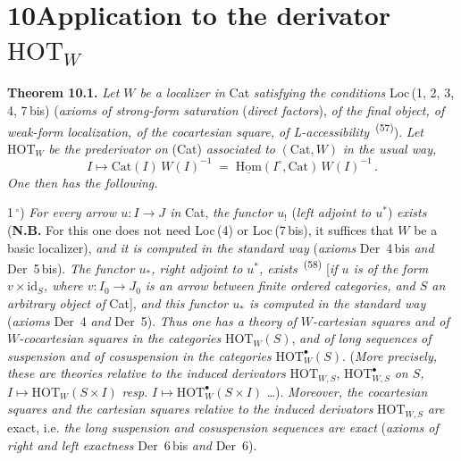 \documentclass[11pt]{article}
\newcommand{\printedpage}[1]{\marginpar{\footnotesize p.~#1}}
\newcommand{\msp}[1]{\marginpar{\footnotesize [#1]}}
\newcommand{\HOT}{\mathrm{HOT}}
\begin{document}
\printedpage{74}

\msp{page 134}

\section*{10\quad Application to the derivator $\HOT_W$}

\textbf{Theorem 10.1.} \textit{Let $W$ be a localizer in} Cat \textit{satisfying the conditions} Loc\,(1, 2, 3, 4, 7\,bis) (\textit{axioms of strong-form saturation} (\textit{direct factors}), \textit{of the final object, of weak-form localization, of the cocartesian square, of L-accessibility}~\textsuperscript{(57)}). \textit{Let} $\HOT_W$ \textit{be the prederivator on} (Cat) \textit{associated to} $(\mathrm{Cat}, W)$ \textit{in the usual way,}
\[
I \longmapsto \mathrm{Cat}(I)\,W(I)^{-1} \;=\; \underline{\mathrm{Hom}}(I^{\circ}, \mathrm{Cat})\,W(I)^{-1}\,. \tag*{(10.1.1)}
\]
\textit{One then has the following.}

1\,$^{\circ}$) \textit{For every arrow $u : I \longrightarrow J$ in} Cat, \textit{the functor $u_!$} (\textit{left adjoint to $u^*$}) \textit{exists} (\textbf{N.B.} For this one does not need Loc\,(4) or Loc\,(7\,bis), it suffices that $W$ be a basic localizer), \textit{and it is computed in the standard way} (\textit{axioms} Der~4\,bis \textit{and} Der~5\,bis). \textit{The functor $u_*$, right adjoint to $u^*$, exists}~\textsuperscript{(58)} [\textit{if $u$ is of the form $v \times \mathrm{id}_S$, where $v : I_0 \longrightarrow J_0$ is an arrow between finite ordered categories, and $S$ an arbitrary object of} Cat], \textit{and this functor $u_*$ is computed in the standard way} (\textit{axioms} Der~4 \textit{and} Der~5). \textit{Thus one has a theory of $W$-cartesian squares and of $W$-cocartesian squares in the categories} $\HOT_W(S)$, \textit{and of long sequences}
\msp{page 135}
\textit{of suspension and of cosuspension in the categories} $\HOT^{\bullet}_W(S)$. (\textit{More precisely, these are theories relative to the induced derivators} $\HOT_{W,S}$, $\HOT^{\bullet}_{W,S}$ \textit{on $S$,} $I \longmapsto \HOT_W(S \times I)$ \textit{resp.} $I \longmapsto \HOT^{\bullet}_W(S \times I)$ \ldots). \textit{Moreover, the cocartesian squares and the cartesian squares relative to the induced derivators} $\HOT_{W,S}$ \textit{are} exact, i.e. \textit{the long suspension and cosuspension sequences are exact} (\textit{axioms of right and left exactness} Der~6\,bis \textit{and} Der~6).
\end{document}
